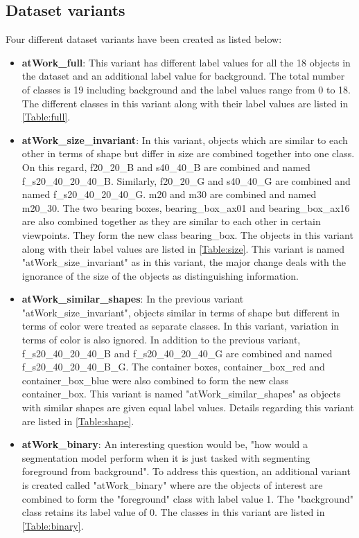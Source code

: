 \documentclass[paper=a4,11pt,parskip=half,toc=listof]{scrartcl}
\begin{document}
	\subsection{Dataset variants}
	\label{section:analysis}
	Four different dataset variants have been created as listed below:
	\begin{itemize}
		\item \textbf{atWork\_full}: This variant has different label values for all the 18 objects in the dataset and an additional label value for background. The total number of classes is 19 including background and the label values range from 0 to 18. The different classes in this variant along with their label values are listed in \ref{Table:full}.
		\item \textbf{atWork\_size\_invariant}: In this variant, objects which are similar to each other in terms of shape but differ in size are combined together into one class. On this regard, f20\_20\_B and s40\_40\_B are combined and named f\_s20\_40\_20\_40\_B. Similarly, f20\_20\_G and s40\_40\_G are combined and named f\_s20\_40\_20\_40\_G. m20 and m30 are combined and named m20\_30. The two bearing boxes, bearing\_box\_ax01 and bearing\_box\_ax16 are also combined together as they are similar to each other in certain viewpoints. They form the new class bearing\_box. The objects in this variant along with their label values are listed in \ref{Table:size}. This variant is named "atWork\_size\_invariant" as in this variant, the major change deals with the ignorance of the size of the objects as distinguishing information.
		\item \textbf{atWork\_similar\_shapes}: In the previous variant "atWork\_size\_invariant", objects similar in terms of shape but different in terms of color were treated as separate classes. In this variant, variation in terms of color is also ignored. In addition to the previous variant, f\_s20\_40\_20\_40\_B and f\_s20\_40\_20\_40\_G are combined and named f\_s20\_40\_20\_40\_B\_G. The container boxes, container\_box\_red and container\_box\_blue were also combined to form the new class container\_box. This variant is named "atWork\_similar\_shapes" as objects with similar shapes are given equal label values. Details regarding this variant are listed in \ref{Table:shape}.
		\item \textbf{atWork\_binary}: An interesting question would be, "how would a segmentation model perform when it is just tasked with segmenting foreground from background". To address this question, an additional variant is created called "atWork\_binary" where are the objects of interest are combined to form the "foreground" class with label value 1. The "background" class retains its label value of 0. The classes in this variant are listed in \ref{Table:binary}.
		

\end{itemize}
\end{document}
